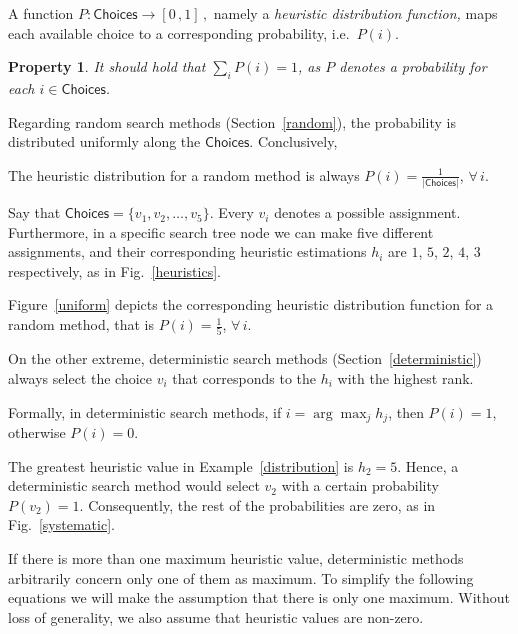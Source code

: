 \documentclass{ws-ijait}
\newtheorem{property}{Property}
\begin{document}
\begin{definition}
  \label{hdf}
  A function $P: \mathsf{Choices} \to [0 \, , 1]\,,$ namely
  a \emph{heuristic distribution function,} maps each
  available choice to a corresponding probability, i.e.\ 
  $P(i)$.
\end{definition}
\begin{property}
  It should hold that $\sum_i P(i) = 1$, as $P$ denotes a
  probability for each $i \in \mathsf{Choices}$.
\end{property}
Regarding random search methods (Section~\ref{random}), the
probability is distributed uniformly along the
$\mathsf{Choices}$. Conclusively,
\begin{proposition}
  \label{probability-random}
  The heuristic distribution for a random method is always
  $P(i) = \frac{1}{|\mathsf{Choices}|}$, $\forall \, i$.
\end{proposition}
\begin{example}
  \label{distribution}
  Say that $\mathsf{Choices} = \{ v_1, v_2, \ldots, v_5 \}$.
  Every $v_i$ denotes a possible assignment. Furthermore, in
  a specific search tree node we can make five different
  assignments, and their corresponding heuristic estimations
  $h_i$ are $1$, $5$, $2$, $4$, $3$ respectively, as in
  Fig.~\ref{heuristics}.

  Figure~\ref{uniform} depicts the corresponding heuristic
  distribution function for a random method, that is $P(i) =
  \frac{1}{5}$, $\forall \, i$.
\end{example}
On the other extreme, deterministic search methods
(Section~\ref{deterministic}) always select the choice $v_i$
that corresponds to the $h_i$ with the highest rank.
\begin{proposition}
  \label{probability-deterministic}
  Formally, in deterministic search methods, if $i =
  \arg\max_j h_j$, then $P(i) = 1$, otherwise $P(i) = 0$.
\end{proposition}
\begin{example}
  The greatest heuristic value in Example~\ref{distribution}
  is $h_2 = 5$. Hence, a deterministic search method would
  select $v_2$ with a certain probability $P(v_2) = 1$.
  Consequently, the rest of the probabilities are zero, as
  in Fig.~\ref{systematic}.
\end{example}
If there is more than one maximum heuristic value,
deterministic methods arbitrarily concern only one of them
as maximum. To simplify the following equations we will make
the assumption that there is only one maximum. Without loss
of generality, we also assume that heuristic values are
non-zero.
\end{document}
